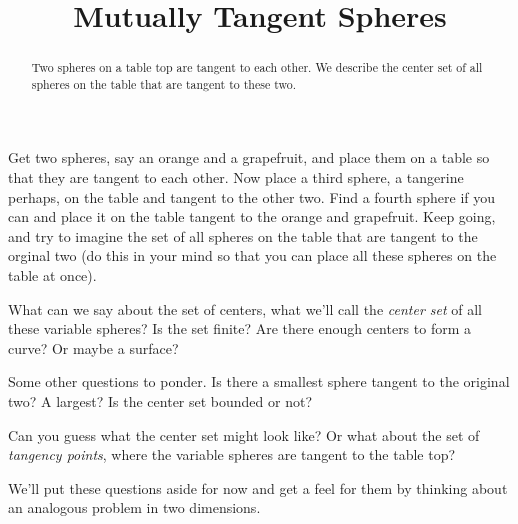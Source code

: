 \documentclass{ximera}
\title{Mutually Tangent Spheres}
\begin{document}
\begin{abstract}
Two spheres on a table top are tangent to each other. We describe the center set of all spheres on the table that are tangent to these two. 
\end{abstract}
\maketitle

Get two spheres, say an orange and a grapefruit, and place them on a table so that they are tangent to each other. Now place a third sphere, a tangerine perhaps, on the table and tangent to the other two. Find a fourth sphere if you can and place it on the table tangent to the orange and grapefruit. Keep going, and try to imagine the set of all spheres on the table that are tangent to the orginal two (do this in your mind so that you can place all these spheres on the table at once). 

What can we say about the set of centers, what we'll call the \emph{center set} of all these variable spheres? Is the set finite? Are there enough centers to form a curve? Or maybe a surface?

Some other questions to ponder. Is there a smallest sphere tangent to the original two? A largest? Is the center set bounded or not?

Can you guess what the center set might look like? Or what about the set of \emph{tangency points}, where the variable spheres are tangent to the table top?

We'll put these questions aside for now and get a feel for them by thinking about an analogous problem in two dimensions.
\end{document}
